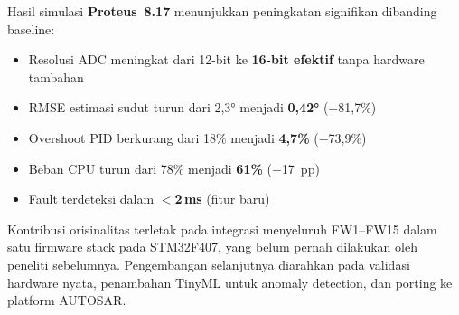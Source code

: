 \documentclass[12pt,a4paper]{article}
\begin{document}
Hasil simulasi \textbf{Proteus~8.17} menunjukkan peningkatan signifikan
dibanding baseline:
\begin{itemize}[leftmargin=1.5cm]
  \item Resolusi ADC meningkat dari 12-bit ke \textbf{16-bit efektif}
    tanpa hardware tambahan
  \item RMSE estimasi sudut turun dari 2,3° menjadi \textbf{0,42°}
    ($-$81,7\%)
  \item Overshoot PID berkurang dari 18\% menjadi \textbf{4,7\%}
    ($-$73,9\%)
  \item Beban CPU turun dari 78\% menjadi \textbf{61\%} ($-$17~pp)
  \item Fault terdeteksi dalam \textbf{$<$2\,ms} (fitur baru)
\end{itemize}

Kontribusi orisinalitas terletak pada integrasi menyeluruh FW1--FW15
dalam satu firmware stack pada STM32F407, yang belum pernah dilakukan
oleh peneliti sebelumnya. Pengembangan selanjutnya diarahkan pada
validasi hardware nyata, penambahan TinyML untuk anomaly detection,
dan porting ke platform AUTOSAR.
\end{document}
